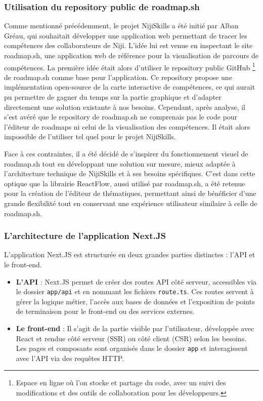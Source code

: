 \documentclass[12pt]{article}
\begin{document}
\subsubsection{Utilisation du repository public de roadmap.sh}
Comme mentionné précédemment, le projet NijiSkills a été initié par Alban Gréau, qui souhaitait développer une application web permettant de tracer les compétences des collaborateurs de Niji. L'idée lui est venue en inspectant le site roadmap.sh, une application web de référence pour la visualisation de parcours de compétences. 
La première idée était alors d'utiliser le repository public GitHub \footnote{Espace en ligne où l’on stocke et partage du code, avec un suivi des modifications et des outils de collaboration pour les développeurs.} de roadmap.sh comme base pour l'application. Ce repository propose une implémentation open-source de la carte interactive de compétences, ce qui aurait pu permettre de gagner du temps sur la partie graphique et d’adapter directement une solution existante à nos besoins. Cependant, après analyse, il s’est avéré que le repository de roadmap.sh ne comprenais pas le code pour l'éditeur de roadmaps ni celui de la visualisation des compétences.
Il était alors impossible de l'utiliser tel quel pour le projet NijiSkills. 

Face à ces contraintes, il a été décidé de s’inspirer du fonctionnement visuel de roadmap.sh tout en développant une solution sur mesure, mieux adaptée à l’architecture technique de NijiSkills et à ses besoins spécifiques. C’est dans cette optique que la librairie ReactFlow, aussi utilisé par roadmap.sh, a été retenue pour la création de l’éditeur de thématiques, permettant ainsi de bénéficier d’une grande flexibilité tout en conservant une expérience utilisateur similaire à celle de roadmap.sh.

\subsubsection{L'architecture de l'application Next.JS}
L'application Next.JS est structurée en deux grandes parties distinctes : l'API et le front-end. 

\begin{itemize}
    \item \textbf{L'API} : Next.JS permet de créer des routes API côté serveur, accessibles via le dossier \texttt{app/api} et en nommant les fichiers \texttt{route.ts}. Ces routes servent à gérer la logique métier, l'accès aux bases de données et l'exposition de points de terminaison pour le front-end ou des services externes.
    \item \textbf{Le front-end} : Il s'agit de la partie visible par l'utilisateur, développée avec React et rendue côté serveur (SSR) ou côté client (CSR) selon les besoins. Les pages et composants sont organisés dans le dossier \texttt{app} et interagissent avec l'API via des requêtes HTTP.
\end{itemize}
\end{document}
